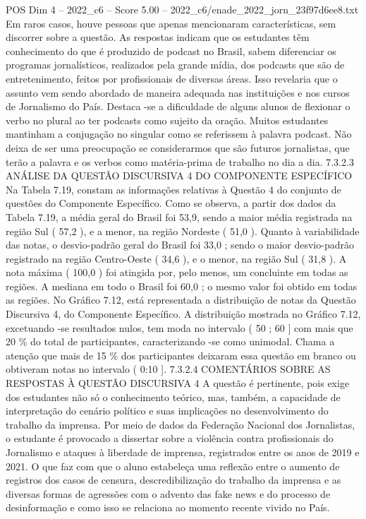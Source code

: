 \begin{textsample}{POS Dim 4 – 2022\_c6 – Score 5.00 – 2022\_c6/enade\_2022\_jorn\_23f97d6ee8.txt}
Em raros casos, houve pessoas que apenas mencionaram características, sem discorrer sobre a questão.
As respostas indicam que os estudantes têm conhecimento do que é produzido de podcast no Brasil, sabem diferenciar os programas jornalísticos, realizados pela grande mídia, dos podcasts que são de entretenimento, feitos por profissionais de diversas áreas.
Isso revelaria que o assunto vem sendo abordado de maneira adequada nas instituições e nos cursos de Jornalismo do País.
Destaca -se a dificuldade de alguns alunos de flexionar o verbo no plural ao ter podcasts como sujeito da oração.
Muitos estudantes mantinham a conjugação no singular como se referissem à palavra podcast.
Não deixa de ser uma preocupação se considerarmos que são futuros jornalistas, que terão a palavra e os verbos como matéria-prima de trabalho no dia a dia. 7.3.2.3 ANÁLISE DA QUESTÃO DISCURSIVA 4 DO COMPONENTE ESPECÍFICO Na Tabela 7.19, constam as informações relativas à Questão 4 do conjunto de questões do Componente Específico.
Como se observa, a partir dos dados da Tabela 7.19, a média geral do Brasil foi 53,9, sendo a maior média registrada na região Sul ( 57,2 ), e a menor, na região Nordeste ( 51,0 ).
Quanto à variabilidade das notas, o desvio-padrão geral do Brasil foi 33,0 ; sendo o maior desvio-padrão registrado na região Centro-Oeste ( 34,6 ), e o menor, na região Sul ( 31,8 ).
A nota máxima ( 100,0 ) foi atingida por, pelo menos, um concluinte em todas as regiões.
A mediana em todo o Brasil foi 60,0 ; o mesmo valor foi obtido em todas as regiões.
No Gráfico 7.12, está representada a distribuição de notas da Questão Discursiva 4, do Componente Específico.
A distribuição mostrada no Gráfico 7.12, excetuando -se resultados nulos, tem moda no intervalo ( 50 ; 60 ] com mais que 20 \% do total de participantes, caracterizando -se como unimodal.
Chama a atenção que mais de 15 \% dos participantes deixaram essa questão em branco ou obtiveram notas no intervalo ( 0:10 ]. 7.3.2.4 COMENTÁRIOS SOBRE AS RESPOSTAS À QUESTÃO DISCURSIVA 4 A questão é pertinente, pois exige dos estudantes não só o conhecimento teórico, mas, também, a capacidade de interpretação do cenário político e suas implicações no desenvolvimento do trabalho da imprensa.
Por meio de dados da Federação Nacional dos Jornalistas, o estudante é provocado a dissertar sobre a violência contra profissionais do Jornalismo e ataques à liberdade de imprensa, registrados entre os anos de 2019 e 2021.
O que faz com que o aluno estabeleça uma reflexão entre o aumento de registros dos casos de censura, descredibilização do trabalho da imprensa e as diversas formas de agressões com o advento das fake news e do processo de desinformação e como isso se relaciona ao momento recente vivido no País.

\end{textsample}
